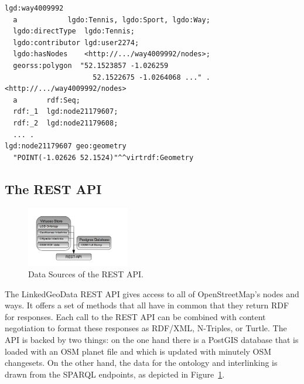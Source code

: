\begin{scriptsize}
\begin{lstlisting}[label=lst:lgd-dataset-example, language=ttl, caption=Example dataset in Turtle syntax.]
lgd:way4009992
  a            lgdo:Tennis, lgdo:Sport, lgdo:Way;
  lgdo:directType  lgdo:Tennis;
  lgdo:contributor lgd:user2274;
  lgdo:hasNodes    <http://.../way4009992/nodes>;
  georss:polygon  "52.1523857 -1.026259
                     52.1522675 -1.0264068 ..." .
<http://.../way4009992/nodes>
  a       rdf:Seq;
  rdf:_1  lgd:node21179607;
  rdf:_2  lgd:node21179608;
  ... .
lgd:node21179607 geo:geometry
  "POINT(-1.02626 52.1524)"^^virtrdf:Geometry
\end{lstlisting}
\end{scriptsize}

\subsection{The REST API}

\begin{figure}[htbp]
	\centering
		\includegraphics[width=0.4\textwidth]{images/RestArchitecture.png}
	\caption{Data Sources of the REST API.}
	\label{fig:rest-api-architecture}
\end{figure}

The LinkedGeoData REST API gives access to all of OpenStreetMap's nodes and ways.
It offers a set of methods that all have in common that they return RDF for responses. 
Each call to the REST API can be combined with content negotiation to format these responses as RDF/XML, N-Triples, or Turtle.
The API is backed by two things: on the one hand there is a PostGIS database
that is loaded with an OSM planet file and which is updated with minutely OSM changesets. On the other hand, the data for the ontology and interlinking is drawn from the SPARQL endpoints, as depicted in Figure~\ref{fig:rest-api-architecture}.

